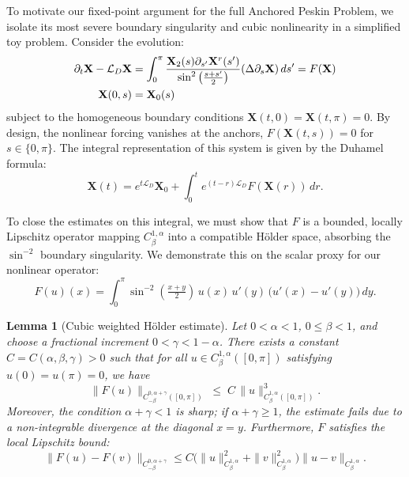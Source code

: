 \documentclass{amsart}
\newcommand{\mX}{\mathbf{X}}
\newcommand{\p}{\partial}
\newtheorem{lemma}[theorem]{Lemma}
\begin{document}
To motivate our fixed-point argument for the full Anchored Peskin Problem, we isolate its most severe boundary singularity and cubic nonlinearity in a simplified toy problem. Consider the evolution:
\begin{align*}
\p_t \mX - \mathcal{L}_D \mX & = \int_0^\pi {\mX_2(s) \p_{s'} \mX^r(s') \over \sin^2\left( { s+ s' \over 2} \right)} (\Delta \p_s \mX) \,ds'= F (\mX)\\
\mX(0,s) & = \mX_0(s)
\end{align*}
subject to the homogeneous boundary conditions $\mX(t,0) = \mX(t,\pi) = 0$. By design, the nonlinear forcing vanishes at the anchors, $F(\mX(t,s)) = 0$ for $s \in \{0,\pi\}$. The integral representation of this system is given by the Duhamel formula:
\[
\mX(t) = e^{t \mathcal{L}_D } \mX_0 + \int_0^t e^{(t-r)\mathcal{L}_D} F(\mX(r)) \,dr.
\]

To close the estimates on this integral, we must show that $F$ is a bounded, locally Lipschitz operator mapping $C^{1,\alpha}_\beta$ into a compatible Hölder space, absorbing the $\sin^{-2}$ boundary singularity.  We demonstrate this on the scalar proxy for our nonlinear operator:
\[
F(u)(x)
=
\int_0^\pi
\sin^{-2}\!\left(\tfrac{x+y}{2}\right)
\,u(x)\,u'(y)\,\big(u'(x)-u'(y)\big)\,dy.
\]

\begin{lemma}[Cubic weighted Hölder estimate]\label{lem:cubic}
Let $0<\alpha<1$, $0\le\beta<1$, and choose a fractional increment $0<\gamma<1-\alpha$. There exists a constant $C = C(\alpha,\beta,\gamma)>0$ such that for all $u\in C^{1,\alpha}_\beta([0,\pi])$ satisfying $u(0)=u(\pi)=0$, we have
\[
\|F(u)\|_{C^{0,\alpha+\gamma}_{-\beta}([0,\pi])}
\;\le\;
C\,\|u\|_{C^{1,\alpha}_\beta([0,\pi])}^{3}.
\]
Moreover, the condition $\alpha+\gamma<1$ is sharp; if $\alpha+\gamma\ge 1$, the estimate fails due to a non-integrable divergence at the diagonal $x=y$. Furthermore, $F$ satisfies the local Lipschitz bound:
\[
\|F(u)-F(v)\|_{C^{0,\alpha+\gamma}_{-\beta}}
\le
C\big(\|u\|_{C^{1,\alpha}_\beta}^{2} +\|v\|_{C^{1,\alpha}_\beta}^{2}\big)
\|u-v\|_{C^{1,\alpha}_\beta}.
\]
\end{lemma}
\end{document}
